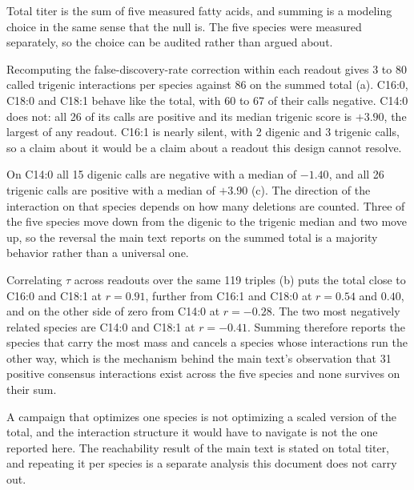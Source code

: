 Total titer is the sum of five measured fatty acids, and summing is a modeling choice in
the same sense that the null is. The five species were measured separately, so the choice
can be audited rather than argued about.

 Recomputing the
false-discovery-rate correction within each readout gives 3 to 80 called trigenic
interactions per species against 86 on the summed total
(a). C16:0, C18:0 and C18:1 behave like the total, with 60 to 67 of
their calls negative. C14:0 does not: all 26 of its calls are positive and its median
trigenic score is $+3.90$, the largest of any readout. C16:1 is nearly silent, with 2
digenic and 3 trigenic calls, so a claim about it would be a claim about a readout this
design cannot resolve.

 On C14:0 all 15 digenic calls are negative with a
median of $-1.40$, and all 26 trigenic calls are positive with a median of $+3.90$
(c). The direction of the interaction on that species depends on
how many deletions are counted. Three of the five species move down from the digenic to
the trigenic median and two move up, so the reversal the main text reports on the summed
total is a majority behavior rather than a universal one.

 Correlating $\tau$ across readouts
over the same 119 triples (b) puts the total close to C16:0 and
C18:1 at $r = 0.91$, further from C16:1 and C18:0 at $r = 0.54$ and $0.40$, and on the
other side of zero from C14:0 at $r = -0.28$. The two most negatively related species are
C14:0 and C18:1 at $r = -0.41$. Summing therefore reports the species that carry the most
mass and cancels a species whose interactions run the other way, which is the mechanism
behind the main text's observation that 31 positive consensus interactions exist across the
five species and none survives on their sum.

 A campaign that optimizes one species is not
optimizing a scaled version of the total, and the interaction structure it would have to
navigate is not the one reported here. The reachability result of the main text is stated
on total titer, and repeating it per species is a separate analysis this document does not
carry out.

